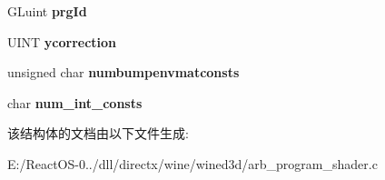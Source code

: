 \begin{DoxyCompactItemize}
G\+Luint {\bfseries prg\+Id}
\item 
\mbox{\label{structarb__ps__compiled__shader_af4017eb774b1e6ce07dcd11e9ac07c68}} 
U\+I\+NT {\bfseries ycorrection}
\item 
\mbox{\label{structarb__ps__compiled__shader_a0350f1bfa6cfee0cb7904646ac331f3f}} 
unsigned char {\bfseries numbumpenvmatconsts}
\item 
\mbox{\label{structarb__ps__compiled__shader_a6ad040f86a230c8a7646f23d1e77c1aa}} 
char {\bfseries num\+\_\+int\+\_\+consts}
\end{DoxyCompactItemize}


该结构体的文档由以下文件生成\+:\begin{DoxyCompactItemize}
\item 
E\+:/\+React\+O\+S-\/0../dll/directx/wine/wined3d/arb\+\_\+program\+\_\+shader.\+c\end{DoxyCompactItemize}
